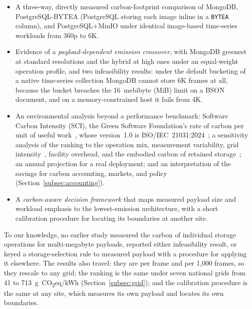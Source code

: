 \documentclass[pdflatex,sn-basic]{sn-jnl}%
\begin{document}
\begin{itemize}
  \item {\color{markup}A three-way, directly measured carbon-footprint comparison of MongoDB, PostgreSQL-BYTEA (PostgreSQL storing each image inline in a \texttt{BYTEA} column), and PostgreSQL+MinIO under identical image-based time-series workloads from 360p to 6K.}
  \item {\color{markup}Evidence of a \emph{payload-dependent emission crossover}, with MongoDB greenest at standard resolutions and the hybrid at high ones under an equal-weight operation profile, and two infeasibility results: under the default bucketing of a native time-series collection MongoDB cannot store 6K frames at all, because the bucket breaches the 16~mebibyte (MiB) limit on a BSON document, and on a memory-constrained host it fails from 4K.}
  \item {\color{markup}An environmental analysis beyond a performance benchmark: Software Carbon Intensity (SCI), the Green Software Foundation's rate of carbon per unit of useful work~\citep{gsf_sci}, whose version~1.0 is ISO/IEC~21031:2024~\citep{iso_iec_21031_sci}; a sensitivity analysis of the ranking to the operation mix, measurement variability, grid intensity~\citep{owid_carbon_intensity}, facility overhead, and the embodied carbon of retained storage~\citep{tannu_ssd_embodied,gupta_chasing_carbon}; an annual projection for a real deployment; and an interpretation of the savings for carbon accounting, markets, and policy (Section~\ref{subsec:accounting}).}
  \item {\color{markup}A \emph{carbon-aware decision framework} that maps measured payload size and workload emphasis to the lowest-emission architecture, with a short calibration procedure for locating its boundaries at another site.}
\end{itemize}

{\color{markup}To our knowledge, no earlier study measured the carbon of individual storage operations for multi-megabyte payloads, reported either infeasibility result, or keyed a storage-selection rule to measured payload with a procedure for applying it elsewhere.} {\color{markup}The results also travel: they are per frame and per 1{,}000 frames, so they rescale to any grid; the ranking is the same under seven national grids from 41 to 713~g~CO\textsubscript{2}eq/kWh (Section~\ref{subsec:grid}); and the calibration procedure is the same at any site, which measures its own payload and locates its own boundaries.}
\end{document}
